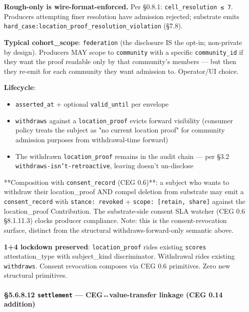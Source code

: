 \documentclass[10pt]{article}
\begin{document}
\textbf{Rough-only is wire-format-enforced.} Per §0.8.1: \texttt{cell\_resolution ≤ 7}. Producers attempting finer resolution have admission rejected; substrate emits \texttt{hard\_case:location\_proof\_resolution\_violation} (§7.8).


\textbf{Typical cohort\_scope}: \texttt{federation} (the disclosure IS the opt-in; non-private by design). Producers MAY scope to \texttt{community} with a specific \texttt{community\_id} if they want the proof readable only by that community's members — but then they re-emit for each community they want admission to. Operator/UI choice.


\textbf{Lifecycle}:


\begin{itemize}\setlength\itemsep{0pt}
\item \texttt{asserted\_at} + optional \texttt{valid\_until} per envelope
\item \texttt{withdraws} against a \texttt{location\_proof} evicts forward visibility (consumer policy treats the subject as "no current location proof" for community admission purposes from withdrawal-time forward)
\item The withdrawn \texttt{location\_proof} remains in the audit chain — per §3.2 \texttt{withdraws-isn't-retroactive}, leaving doesn't un-disclose
\end{itemize}


**Composition with \texttt{consent\_record} (CEG 0.6)**: a subject who wants to withdraw their location\_proof AND compel deletion from substrate may emit a \texttt{consent\_record} with \texttt{stance: revoked} + \texttt{scope: [retain, share]} against the location\_proof Contribution. The substrate-side consent SLA watcher (CEG 0.6 §8.1.11.3) clocks producer compliance. Note: this is the consent-revocation surface, distinct from the structural withdraws-forward-only semantic above.


\textbf{1+4 lockdown preserved}: \texttt{location\_proof} rides existing \texttt{scores} attestation\_type with subject\_kind discriminator. Withdrawal rides existing \texttt{withdraws}. Consent revocation composes via CEG 0.6 primitives. Zero new structural primitives.


\paragraph{§5.6.8.12 \texttt{settlement} — CEG↔value-transfer linkage (CEG 0.14 addition)}\mbox{}\\
\end{document}
